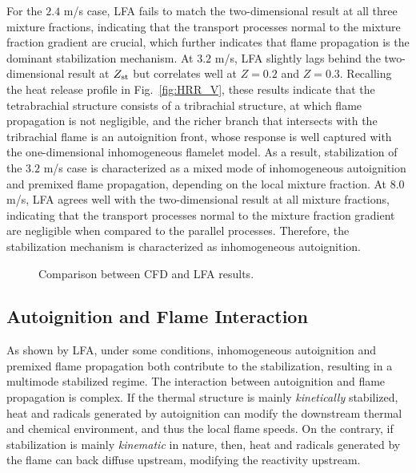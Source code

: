 \documentclass[review,3p,times]{elsarticle}
\begin{document}
For the $2.4$ m/s case, LFA fails to match the two-dimensional result at all three mixture fractions, indicating that the transport processes normal to the mixture fraction gradient are crucial, which further indicates that flame propagation is the dominant stabilization mechanism.  At $3.2$ m/s, LFA slightly lags behind the two-dimensional result at $Z_{\rm st}$ but correlates well at $Z = 0.2$ and $Z = 0.3$.  Recalling the heat release profile in Fig.~\ref{fig:HRR_V}, these results indicate that the tetrabrachial structure consists of a tribrachial structure, at which flame propagation is not negligible, and the richer branch that intersects with the tribrachial flame is an autoignition front, whose response is well captured with the one-dimensional inhomogeneous flamelet model.  As a result, stabilization of the $3.2$ m/s case is characterized as a mixed mode of inhomogeneous autoignition and premixed flame propagation, depending on the local mixture fraction.  At $8.0$ m/s, LFA agrees well with the two-dimensional result at all mixture fractions, indicating that the transport processes normal to the mixture fraction gradient are negligible when compared to the parallel processes.  Therefore, the stabilization mechanism is characterized as inhomogeneous autoignition.

\begin{figure}
  \centering
  \scriptsize
  \resizebox{1.0\textwidth}{!}{}
  \normalsize
  \vspace{-0.2in}
  \caption{Comparison between CFD and LFA results.}
  \label{fig:LFA_V}
\end{figure}

\subsection{Autoignition and Flame Interaction}

As shown by LFA, under some conditions, inhomogeneous autoignition and premixed flame propagation both contribute to the stabilization, resulting in a multimode stabilized regime.  The interaction between autoignition and flame propagation is complex.  If the thermal structure is mainly \emph{kinetically} stabilized, heat and radicals generated by autoignition can modify the  downstream thermal and chemical environment, and thus the local flame speeds.  On the contrary, if stabilization is mainly \emph{kinematic} in nature, then, heat and radicals generated by the flame can back diffuse upstream, modifying the reactivity upstream.  
\end{document}

